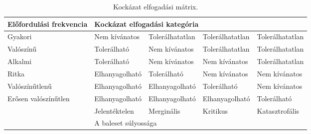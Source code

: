 \begin{table}
    \centering
    \begin{tabular}{|l|l|l|l|l|} 
        \hline
        Előfordulási frekvencia & \multicolumn{4}{l|}{Kockázat elfogadási kategória}                    \\ 
        \hline
        Gyakori                 & Nem kívánatos  & Tolerálhatatlan & Tolerálhatatlan & Tolerálhatatlan  \\ 
        \hline
        Valószínű               & Tolerálható    & Nem kívánatos   & Tolerálhatatlan & Tolerálhatatlan  \\ 
        \hline
        Alkalmi                 & Tolerálható    & Nem kívánatos   & Nem kívánatos   & Tolerálhatatlan  \\ 
        \hline
        Ritka                   & Elhanyagolható & Tolerálható     & Nem kívánatos   & Nem kívánatos    \\ 
        \hline
        Valószínűtlenű          & Elhanyagolható & Elhanyagolható  & Tolerálható     & Nem kívánatos    \\ 
        \hline
        Erősen valószínűtlen    & Elhanyagolható & Elhanyagolható  & Elhanyagolható  & Tolerálható      \\ 
        \hline
        \multicolumn{1}{l|}{}   & Jelentéktelen  & Merginális      & Kritikus        & Katasztrofális   \\ 
        \cline{2-5}
        \multicolumn{1}{l|}{}   & \multicolumn{4}{l|}{A baleset súlyossága}                             \\
        \cline{2-5}
        \end{tabular}
    \caption{Kockázat elfogadási mátrix.}
    \label{tab:risk_mat}
\end{table}





